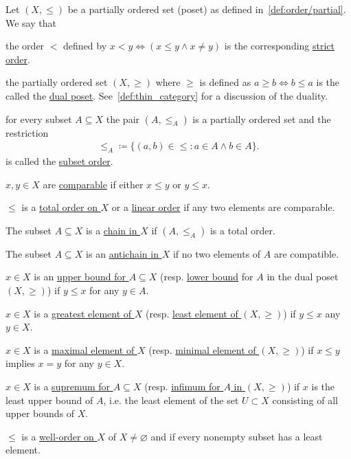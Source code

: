 \begin{definition}\label{def:poset}\cite[10]{Lectures:general_topology}
  Let $(X, \leq)$ be a partially ordered set (poset) as defined in~\cref{def:order/partial}. We say that
  \begin{defenum}
    \item\label{def:poset/strict_order} the order $<$ defined by $x < y \iff (x \leq y \land x \neq y)$ is the corresponding \uline{strict order}.

    \item\label{def:poset/dual} the partially ordered set $(X, \geq)$ where $\geq$ is defined as $a \geq b \iff b \leq a$ is the called the \uline{dual poset}. See~\cref{def:thin_category} for a discussion of the duality.

    \item\label{def:poset/subset_order} for every subset $A \subseteq X$ the pair $(A, \leq_A)$ is a partially ordered set and the restriction
    \begin{align*}
      \leq_A \coloneqq \{ (a, b) \in \leq \colon a \in A \land b \in A \}.
    \end{align*}
    is called the \uline{subset order}.

    \item\label{def:poset/comparable_elements} $x, y \in X$ are \uline{comparable} if either $x \leq y$ or $y \leq x$.
    \item\label{def:poset/total_order} $\leq$ is a \uline{total order on $X$} or a \uline{linear order} if any two elements are comparable.
    \item\label{def:poset/chain} The subset $A \subseteq X$ is a \uline{chain in $X$} if $(A, \leq_A)$ is a total order.
    \item\label{def:poset/antichain} The subset $A \subseteq X$ is an \uline{antichain in $X$} if no two elements of $A$ are compatible.
    \item\label{def:poset/upper_lower_bound} $x \in X$ is an \uline{upper bound for $A \subseteq X$} (resp. \uline{lower bound} for $A$ in the dual poset $(X, \geq)$) if $y \leq x$ for any $y \in A$.
    \item\label{def:poset/greatest_least_element} $x \in X$ is a \uline{greatest element of $X$} (resp. \uline{least element of $(X, \geq)$}) if $y \leq x$ any $y \in X$.
    \item\label{def:poset/maximal_minimal_element} $x \in X$ is a \uline{maximal element of $X$} (resp. \uline{minimal element of $(X, \geq)$}) if $x \leq y$ implies $x = y$ for any $y \in X$.
    \item\label{def:poset/supremum_infimum} $x \in X$ is a \uline{supremum for $A \subseteq X$} (resp. \uline{infimum for $A$ in $(X, \geq)$}) if $x$ is the least upper bound of $A$, i.e. the least element of the set $U \subset X$ consisting of all upper bounds of $X$.
    \item\label{def:poset/well_order} $\leq$ is a \uline{well-order on $X$} of $X \neq \varnothing$ and if every nonempty subset has a least element.
  \end{defenum}
\end{definition}


